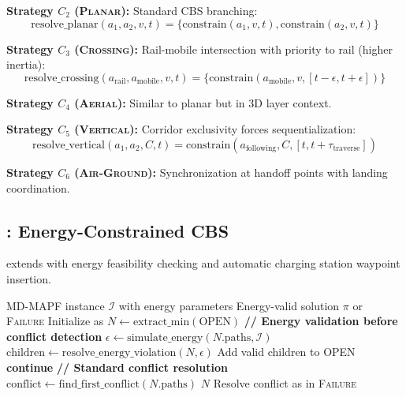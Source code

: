 \textbf{Strategy $C_2$ (\textsc{Planar}):} Standard CBS branching:
\begin{equation}
\text{resolve\_planar}(a_1, a_2, v, t) = \{\text{constrain}(a_1, v, t), \text{constrain}(a_2, v, t)\}
\end{equation}

\textbf{Strategy $C_3$ (\textsc{Crossing}):} Rail-mobile intersection with priority to rail (higher inertia):
\begin{equation}
\text{resolve\_crossing}(a_{\text{rail}}, a_{\text{mobile}}, v, t) = \{\text{constrain}(a_{\text{mobile}}, v, [t-\epsilon, t+\epsilon])\}
\end{equation}

\textbf{Strategy $C_4$ (\textsc{Aerial}):} Similar to planar but in 3D layer context.

\textbf{Strategy $C_5$ (\textsc{Vertical}):} Corridor exclusivity forces sequentialization:
\begin{equation}
\text{resolve\_vertical}(a_1, a_2, C, t) = \text{constrain}(a_{\text{following}}, C, [t, t + \tau_{\text{traverse}}])
\end{equation}

\textbf{Strategy $C_6$ (\textsc{Air-Ground}):} Synchronization at handoff points with landing coordination.

\subsection{\ecbs{}: Energy-Constrained CBS}

\ecbs{} extends \mixedcbs{} with energy feasibility checking and automatic charging station waypoint insertion.

\begin{algorithm}
\caption{\ecbs{} Algorithm}
\label{alg:ecbs}
\begin{algorithmic}[1]
\REQUIRE MD-MAPF instance $\mathcal{I}$ with energy parameters
\ENSURE Energy-valid solution $\pi$ or \textsc{Failure}
\STATE Initialize as \mixedcbs{}
    \STATE $N \leftarrow \text{extract\_min}(\text{OPEN})$
    \STATE \textbf{// Energy validation before conflict detection}
    \STATE $\epsilon \leftarrow \text{simulate\_energy}(N.\text{paths}, \mathcal{I})$
    \IF{$\epsilon \neq \emptyset$}
        \STATE $\text{children} \leftarrow \text{resolve\_energy\_violation}(N, \epsilon)$
        \STATE Add valid children to OPEN
        \STATE \textbf{continue}
    \ENDIF
    \STATE \textbf{// Standard conflict resolution}
    \STATE $\text{conflict} \leftarrow \text{find\_first\_conflict}(N.\text{paths})$
        \RETURN $N$
    \ENDIF
    \STATE Resolve conflict as in \mixedcbs{}
\ENDWHILE
\RETURN \textsc{Failure}
\end{algorithmic}
\end{algorithm}

